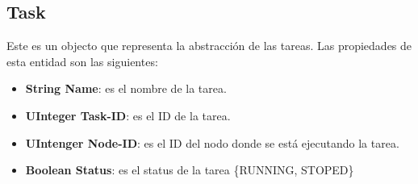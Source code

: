 \subsection{Task}
Este es un objecto que representa la abstracción de las tareas. Las propiedades
de esta entidad son las siguientes:
\begin{itemize}
\item \textbf{String Name}: es el nombre de la tarea.
  \item \textbf{UInteger Task-ID}: es el ID de la tarea.
  \item \textbf{UIntenger Node-ID}: es el ID del nodo donde se está ejecutando
    la tarea.
  \item \textbf{Boolean Status}: es el status de la tarea \{RUNNING, STOPED\}
\end{itemize}



